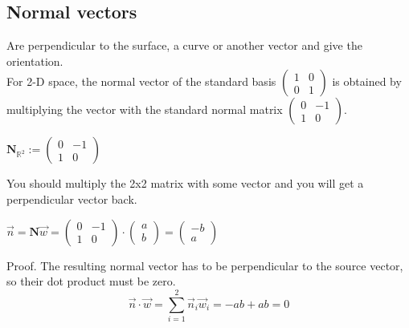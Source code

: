 \documentclass[a4paper]{article}
\begin{document}
\begin{Example}
\subsection{Normal vectors}

Are perpendicular to the surface, a curve or another vector and give the orientation.\\

For 2-D space, the normal vector of the standard basis $\begin{pmatrix}1&0\\0&1\end{pmatrix}$ is obtained by multiplying the vector with the standard normal matrix $\begin{pmatrix}0 & -1 \\ 1 & 0\end{pmatrix}$.\\

\begin{center}
$\boldsymbol{N}_{\mathbb{R}^{2}} := \begin{pmatrix}0 & -1 \\ 1 & 0\end{pmatrix}$\\
\end{center}

You should multiply the 2x2 matrix with some vector and you will get a perpendicular vector back.

\begin{center}
$\vec{n} = \boldsymbol{N}\vec{w} = \begin{pmatrix}0 & -1 \\ 1 & 0\end{pmatrix} \cdot \begin{pmatrix}a\\b\end{pmatrix} = \begin{pmatrix}-b\\a\end{pmatrix}$
\end{center}

Proof. The resulting normal vector has to be perpendicular to the source vector, so their dot product must be zero.\\



\begin{displaymath}
\vec{n} \cdot \vec{w} = \sum_{i=1}^{2}\vec{n}_{i}\vec{w}_i = -ab + ab = 0
\end{displaymath}


\end{Example}
\end{document}
